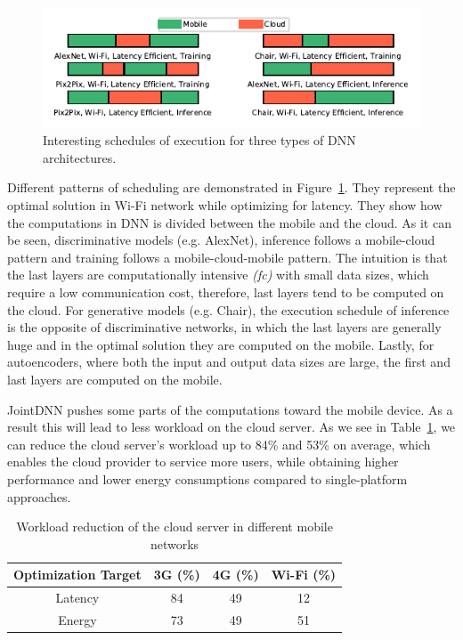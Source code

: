 \begin{figure}[t]
\includegraphics{interesting_patterns}
\caption{Interesting schedules of execution for three types of DNN architectures.} \label{interesting_patterns}
\end{figure}

Different patterns of scheduling are demonstrated in Figure~\ref{interesting_patterns}. They represent the optimal solution in Wi-Fi network while optimizing for latency. They show how the computations in DNN is divided between the mobile and the cloud. As it can be seen, discriminative models (e.g. AlexNet), inference follows a mobile-cloud pattern and training follows a mobile-cloud-mobile pattern. The intuition is that the last layers are computationally intensive \textit{(fc)} with small data sizes, which require a low communication cost, therefore, last layers tend to be computed on the cloud. For generative models (e.g. Chair), the execution schedule of inference is the opposite of discriminative networks, in which the last layers are generally huge and in the optimal solution they are computed on the mobile. Lastly, for autoencoders, where both the input and output data sizes are large, the first and last layers are computed on the mobile.


JointDNN pushes some parts of the computations toward the mobile device. As a result this will lead to less workload on the cloud server. As we see in Table~\ref{cloud_improvement}, we can reduce the cloud server's workload up to 84\% and 53\% on average, which enables the cloud provider to service more users, while obtaining higher performance and lower energy consumptions compared to single-platform approaches.  

\begin{table}[h]
\centering
\caption{Workload reduction of the cloud server in different mobile networks}
\label{cloud_improvement}
\begin{tabular}{|c|c|c|c|}
\hline
\textbf{Optimization Target} & \textbf{3G (\%)} & \textbf{4G (\%)} & \textbf{Wi-Fi (\%)} \\ \hline
Latency                      & 84               & 49               & 12                  \\ \hline
Energy                       & 73               & 49               & 51                  \\ \hline
\end{tabular}
\end{table}

